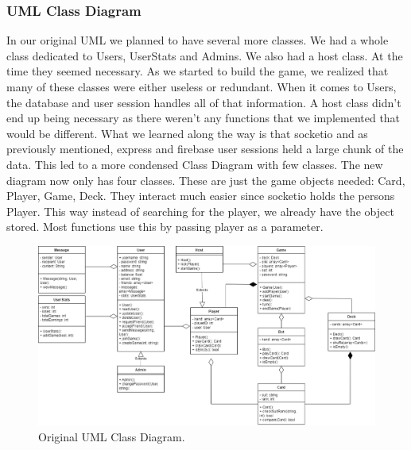 \documentclass{article}
\begin{document}
\begin{tcolorbox}[colback=blue!10, colframe=blue, boxrule=0.5mm, sharp corners=south]
\subsubsection{UML Class Diagram}
In our original UML we planned to have several more classes. We had a whole class dedicated to Users, UserStats and Admins. We also had a host class. At the time they seemed necessary. As we started to build the game, we realized that many of these classes were either useless or redundant. When it comes to Users, the database and user session handles all of that information. A host class didn't end up being necessary as there weren't any functions that we implemented that would be different. What we learned along the way is that socketio and as previously mentioned, express and firebase user sessions held a large chunk of the data. This led to a more condensed Class Diagram with few classes. The new diagram now only has four classes. These are just the game objects needed: Card, Player, Game, Deck. They interact much easier since socketio holds the persons Player. This way instead of searching for the player, we already have the object stored. Most functions use this by passing player as a parameter.
\end{tcolorbox}

\begin{figure}[h]
\centering
\includegraphics[width=\linewidth]{Crazy8sUML.png}
\caption{\label{fig:OldUML}Original UML Class Diagram.}
\end{figure}
\end{document}
